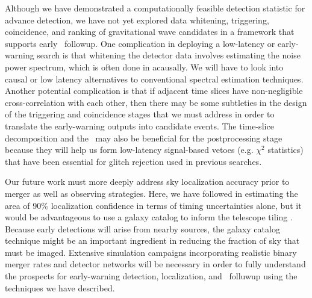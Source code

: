 Although we have demonstrated a computationally feasible detection statistic for
advance detection, we have not yet explored data whitening, triggering,
coincidence, and ranking of gravitational wave candidates in a framework that
supports early \EM\ followup.  One complication in deploying a low-latency or
early-warning search is that whitening the detector data involves estimating the
noise power spectrum, which is often done in acausally.  We will have to look into
causal or low latency alternatives to conventional spectral estimation techniques.
Another potential complication is that if adjacent time slices have non-negligible
cross-correlation with each other, then there may be some subtleties in the design
of the triggering and coincidence stages that we must address in order to translate
the early-warning outputs into candidate events.  The time-slice decomposition and
the \SVD\ may also be beneficial for the postprocessing stage because they will
help us form low-latency signal-based vetoes (e.g. $\chi^2$ statistics)
that have been essential for glitch rejection used in previous \GW{} \CBC{}
searches.

Our future work must more deeply address sky localization accuracy prior to
merger as well as observing strategies. Here, we have followed
\citet{Fairhurst2009} in estimating the area of 90\% localization confidence in
terms of timing uncertainties alone, but it would be advantageous to use a
galaxy catalog to inform the telescope tiling \citep{galaxy-catalog}. Because
early detections will arise from nearby sources, the galaxy catalog technique
might be an important ingredient in reducing the fraction of sky that must be
imaged.  Extensive simulation campaigns incorporating realistic binary merger
rates and detector networks will be necessary in order to fully understand the
prospects for early-warning detection, localization, and \EM\ folluwup using
the techniques we have described.



